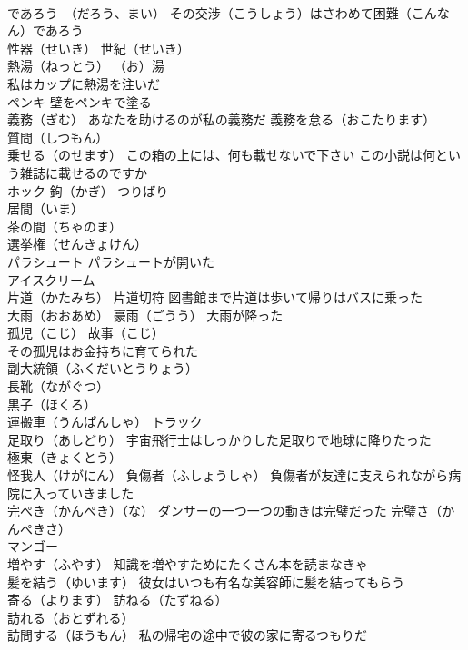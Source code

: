 \documentclass[8pt]{extreport}
\begin{document}
\begin{CJK}{UTF8}{min}
\\	であろう　（だろう、まい） その交渉（こうしょう）はさわめて困難（こんなん）であろう
\\	性器（せいき） 世紀（せいき）
\\	熱湯（ねっとう） （お）湯 
\\	私はカップに熱湯を注いだ
\\	ペンキ 壁をペンキで塗る
\\	義務（ぎむ） あなたを助けるのが私の義務だ 義務を怠る（おこたります）
\\	質問（しつもん）
\\	乗せる（のせます） この箱の上には、何も載せないで下さい この小説は何という雑誌に載せるのですか
\\	ホック 鉤（かぎ） つりばり
\\	居間（いま）　
\\	茶の間（ちゃのま）　
\\	選挙権（せんきょけん）
\\	パラシュート パラシュートが開いた
\\	アイスクリーム
\\	片道（かたみち） 片道切符 図書館まで片道は歩いて帰りはバスに乗った
\\	大雨（おおあめ） 豪雨（ごうう） 大雨が降った
\\	孤児（こじ） 故事（こじ）
\\	その孤児はお金持ちに育てられた
\\	副大統領（ふくだいとうりょう）
\\	長靴（ながぐつ）
\\	黒子（ほくろ）
\\	運搬車（うんぱんしゃ） トラック
\\	足取り（あしどり） 宇宙飛行士はしっかりした足取りで地球に降りたった
\\	極東（きょくとう）
\\	怪我人（けがにん） 負傷者（ふしょうしゃ） 負傷者が友達に支えられながら病院に入っていきました
\\	完ぺき（かんぺき）（な） ダンサーの一つ一つの動きは完璧だった 完璧さ（かんぺきさ）
\\	マンゴー
\\	増やす（ふやす） 知識を増やすためにたくさん本を読まなきゃ
\\	髪を結う（ゆいます） 彼女はいつも有名な美容師に髪を結ってもらう
\\	寄る（よります） 訪ねる（たずねる）
\\	訪れる（おとずれる）
\\	訪問する（ほうもん） 私の帰宅の途中で彼の家に寄るつもりだ

\end{CJK}
\end{document}
